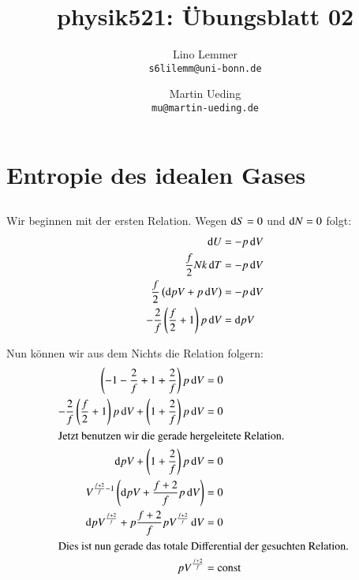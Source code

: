 

\setcounter{section}{1}
\renewcommand\thesection{H\,2.\arabic{section}}
\renewcommand\thesubsection{\thesection.\alph{subsection}}

\title{physik521: Übungsblatt 02}
\author{Lino Lemmer \\ \small{\texttt{s6lilemm@uni-bonn.de}} \and Martin Ueding \\ \small{\texttt{mu@martin-ueding.de}}}


\maketitle
\section{Entropie des idealen Gases}

\subsection{}

Wir beginnen mit der ersten Relation. Wegen $\dif S = 0$ und $\dif N = 0$ folgt:
\begin{align*}
    \dif U &= - p \dif V \\
    \frac f2 N k \dif T &= - p \dif V \\
    \frac f2 \left( \dif p V + p \dif V \right) &= - p \dif V \\
        - \frac 2f \left( \frac f2 + 1 \right) p \dif V &= \dif p V
\end{align*}

Nun können wir aus dem Nichts die Relation folgern:
\begin{align*}
    \left( -1 - \frac 2f + 1 + \frac 2f \right) p \dif V &= 0 \\
    - \frac 2f \left( \frac f2 + 1 \right) p \dif V + \left( 1 + \frac 2f \right) p \dif V &= 0 \\
    \intertext{%
        Jetzt benutzen wir die gerade hergeleitete Relation.
    }
    \dif p V + \left( 1 + \frac 2f \right) p \dif V &= 0 \\
    V^{\frac{f+2}f -1} \left( \dif p V + \frac{f+2}f p \dif V \right) &= 0 \\
    \dif p V^{\frac{f+2}f} + p \frac{f+2}f p V^{\frac{f+2}f} \dif V &= 0 \\
    \intertext{%
        Dies ist nun gerade das totale Differential der
        gesuchten Relation.
    }
    p V^{\frac{f+2}f} &= \text{const}
\end{align*}

